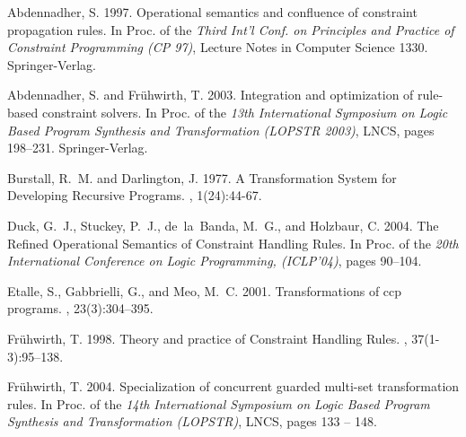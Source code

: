 \documentclass[final]{acmtrans2e}
\begin{document}

\begin{thebibliography}{}

 {\sc Abdennadher, S.} 1997.
\newblock Operational semantics and confluence of constraint propagation rules.
\newblock In Proc. of the {\em Third Int'l Conf. on
Principles and Practice of Constraint Programming (CP 97)},
Lecture Notes in Computer Science 1330. Springer-Verlag.


 {\sc Abdennadher, S.} {\sc and} {\sc Fr\"uhwirth, T.}  2003.
\newblock Integration and optimization of rule-based constraint solvers. \newblock In Proc. of the  {\em 13th International Symposium on  Logic Based Program Synthesis and
        Transformation (LOPSTR 2003)}, LNCS, pages 198--231. Springer-Verlag.


 {\sc Burstall, R.~M.} {\sc and} {\sc Darlington, J.}  1977.
\newblock A Transformation System for Developing Recursive Programs.
, 1(24):44-67.


{\sc Duck, G.~J.}, {\sc
Stuckey, P.~J.}, {\sc de~la~Banda, M.~G.}, {\sc and}  {\sc Holzbaur, C.} 2004.
\newblock The Refined Operational Semantics of Constraint Handling Rules.
\newblock In Proc. of  the {\em  20th
International Conference on Logic Programming, (ICLP'04)}, pages 90--104.



{\sc Etalle, S.}, {\sc Gabbrielli, G.}, {\sc and}  {\sc Meo, M.~C.} 2001.
\newblock Transformations of ccp programs.
, 23(3):304--395.

{\sc Fr\"uhwirth, T.} 1998.
\newblock Theory and practice of Constraint Handling Rules.
, 37(1-3):95--138.

{\sc Fr\"uhwirth, T.} 2004.
\newblock Specialization of concurrent guarded multi-set transformation rules.
\newblock In Proc. of the  {\em 14th International Symposium on  Logic Based Program Synthesis and
  Transformation (LOPSTR)}, LNCS, pages 133 -- 148.


\end{thebibliography}
\end{document}
